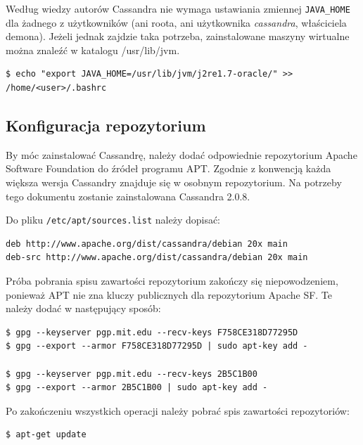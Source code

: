\documentclass{article}
\begin{document}
Według wiedzy autorów Cassandra nie wymaga ustawiania zmiennej \lstinline[style=bash]!JAVA_HOME! dla żadnego z użytkowników (ani roota, ani użytkownika \textit{cassandra}, właściciela demona). Jeżeli jednak zajdzie taka potrzeba, zainstalowane maszyny wirtualne można znaleźć w katalogu /usr/lib/jvm.

\begin{lstlisting}[style=bash, caption={ustawianie JAVA\textunderscore HOME}]
$ echo "export JAVA_HOME=/usr/lib/jvm/j2re1.7-oracle/" >> /home/<user>/.bashrc
\end{lstlisting}

\subsection{Konfiguracja repozytorium}

By móc zainstalować Cassandrę, należy dodać odpowiednie repozytorium Apache Software Foundation do źródeł programu APT. Zgodnie z konwencją każda większa wersja Cassandry znajduje się w osobnym repozytorium. Na potrzeby tego dokumentu zostanie zainstalowana Cassandra 2.0.8.

Do pliku \lstinline[style=bash]!/etc/apt/sources.list! należy dopisać:

\begin{lstlisting}[style=bash, caption={nowe źródłą pakietów dla APTa}]
deb http://www.apache.org/dist/cassandra/debian 20x main
deb-src http://www.apache.org/dist/cassandra/debian 20x main
\end{lstlisting}

Próba pobrania spisu zawartości repozytorium zakończy się niepowodzeniem, ponieważ APT nie zna kluczy publicznych dla repozytorium Apache SF. Te należy dodać w następujący sposób:

\begin{lstlisting}[style=bash, caption={pobieranie kluczy publicznych repozytorium ASF}]
$ gpg --keyserver pgp.mit.edu --recv-keys F758CE318D77295D
$ gpg --export --armor F758CE318D77295D | sudo apt-key add -

$ gpg --keyserver pgp.mit.edu --recv-keys 2B5C1B00
$ gpg --export --armor 2B5C1B00 | sudo apt-key add -
\end{lstlisting}

Po zakończeniu wszystkich operacji należy pobrać spis zawartości repozytoriów:
\begin{lstlisting}[style=bash, caption={odświeżanie list pakietów}]
$ apt-get update
\end{lstlisting}
\end{document}
